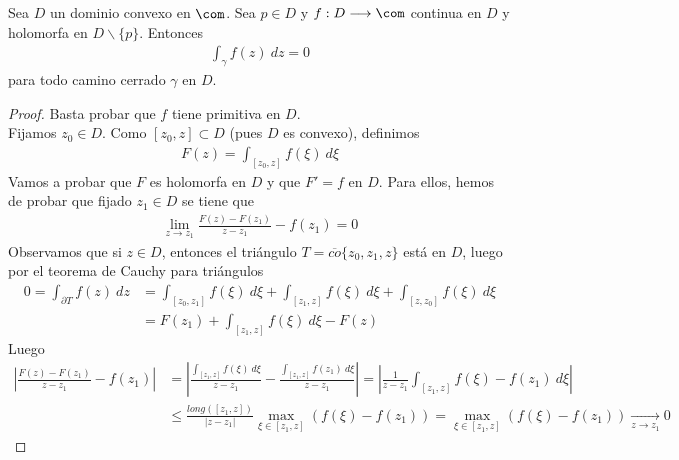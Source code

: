 \begin{teo}
Sea $D$ un dominio convexo en $\com$. Sea $p \in D$ y $f: D \longrightarrow \com$ continua en $D$ y holomorfa en $D \backslash \{p\}$. Entonces
\begin{align*}
    \int_{\gamma}{f(z) \ dz} = 0
\end{align*}
para todo camino cerrado $\gamma$ en $D$.
\end{teo}

\begin{proof}
Basta probar que $f$ tiene primitiva en $D$.
\\
\newline
Fijamos $z_0 \in D$. Como $[z_0,z] \subset D$ (pues $D$ es convexo), definimos
\begin{align*}
    F(z) = \int_{[z_0,z]}{f(\xi) \ d\xi}
\end{align*}
Vamos a probar que $F$ es holomorfa en $D$ y que $F' = f$ en $D$. Para ellos, hemos de probar que fijado $z_1 \in D$ se tiene que
\begin{align*}
    \lim_{z \to z_1} \frac{F(z) - F(z_1)}{z - z_1} - f(z_1) = 0
\end{align*}
Observamos que si $z \in D$, entonces el triángulo $T = \overline{co}\{z_0,z_1,z\}$ está en $D$, luego por el teorema de Cauchy para triángulos
\begin{align*}
    0 = \int_{\partial T}{f(z) \ dz} &= \int_{[z_0,z_1]}{f(\xi) \ d\xi} + \int_{[z_1,z]}{f(\xi) \ d\xi} + \int_{[z,z_0]}{f(\xi) \ d\xi} \\
    &= F(z_1) + \int_{[z_1,z]}{f(\xi) \ d\xi}- F(z)
\end{align*}
Luego
\begin{align*}
    \left| \frac{F(z) - F(z_1)}{z - z_1} - f(z_1) \right| &= \left| \frac{\int_{[z_1,z]}{f(\xi) \ d\xi}}{z-z_1} - \frac{\int_{[z_1,z]}{f(z_1) \ d\xi}}{z-z_1} \right| = \left| \frac{1}{z-z_1}\int_{[z_1,z]}{f(\xi) - f(z_1) \ d\xi}\right| \\
    & \leq \frac{long([z_1,z])}{|z-z_1|} \max_{\xi \in [z_1,z]}(f(\xi) - f(z_1)) = \max_{\xi \in [z_1,z]}(f(\xi) - f(z_1)) \xrightarrow[z \to z_1]{} 0 
\end{align*}
\end{proof}

